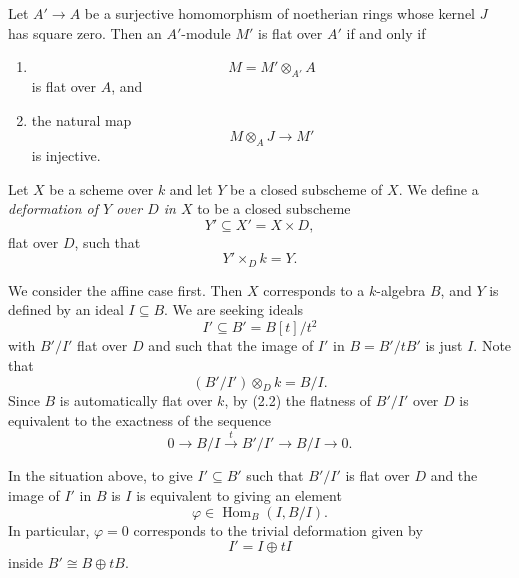 \begin{proposition}
\label{proposition-square-zero-flatness}
Let $A'\to A$ be a surjective homomorphism
of noetherian rings whose kernel $J$ has
square zero. Then an $A'$-module $M'$ is flat
over $A'$ if and only if
\begin{enumerate}
\item
$$
M=M'\otimes_{A'}A
$$
is flat over $A$, and
\item the natural map
$$
M\otimes_AJ\longrightarrow M'
$$
is injective.
\end{enumerate}
\end{proposition}

\begin{definition}
\label{definition-embedded-first-order}
Let $X$ be a scheme over $k$ and let $Y$ be
a closed subscheme of $X$. We define a
\emph{deformation of $Y$ over $D$ in $X$} to
be a closed subscheme
$$
Y'\subseteq X'=X\times D,
$$
flat over $D$, such that
$$
Y'\times_D k=Y.
$$
\end{definition}

We consider the affine case first. Then $X$
corresponds to a $k$-algebra $B$, and $Y$ is
defined by an ideal $I\subseteq B$. We are
seeking ideals
$$
I'\subseteq B'=B[t]/t^2
$$
with $B'/I'$ flat over $D$ and such that the
image of $I'$ in $B=B'/tB'$ is just $I$.
Note that
$$
(B'/I')\otimes_Dk=B/I.
$$
Since $B$ is automatically flat over $k$,
by (2.2) the flatness of
$B'/I'$ over $D$ is equivalent to the
exactness of the sequence
$$
0\longrightarrow B/I
\xrightarrow{t}B'/I'
\longrightarrow B/I
\longrightarrow 0.
$$

\begin{proposition}
\label{proposition-affine-first-order}
In the situation above, to give
$I'\subseteq B'$ such that $B'/I'$ is flat
over $D$ and the image of $I'$ in $B$ is $I$
is equivalent to giving an element
$$
\varphi\in\operatorname{Hom}_B(I,B/I).
$$
In particular, $\varphi=0$ corresponds to the
trivial deformation given by
$$
I'=I\oplus tI
$$
inside $B'\cong B\oplus tB$.
\end{proposition}

